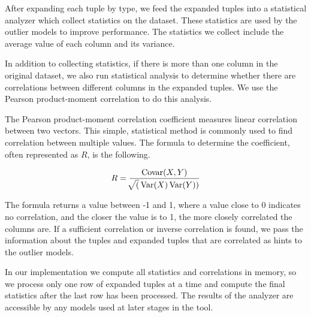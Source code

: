 
After expanding each tuple by type, we feed the expanded tuples into a statistical analyzer which collect statistics on the dataset.
These statistics are used by the outlier models to improve performance.
The statistics we collect include the average value of each column and its variance.

In addition to collecting statistics, if there is more than one column in the original dataset, we also run statistical analysis to determine whether there are correlations between different columns in the expanded tuples.
We use the Pearson product-moment correlation to do this analysis.

The Pearson product-moment correlation coefficient measures linear correlation between two vectors.
This simple, statistical method is commonly used to find correlation between multiple values.
The formula to determine the coefficient, often represented as $R$, is the following.

$$
R = \frac{\operatorname{Covar}(X,Y)}{\sqrt[](\operatorname{Var}(X)\operatorname{Var}(Y))}
$$

The formula returns a value between -1 and 1, where a value close to 0 indicates no correlation, and the closer the value is to 1, the more closely correlated the columns are.
If a sufficient correlation or inverse correlation is found, we pass the information about the tuples and expanded tuples that are correlated as hints to the outlier models.

In our implementation we compute all statistics and correlations in memory, so we process only one row of expanded tuples at a time and compute the final statistics after the last row has been processed.
The results of the analyzer are accessible by any models used at later stages in the tool.
